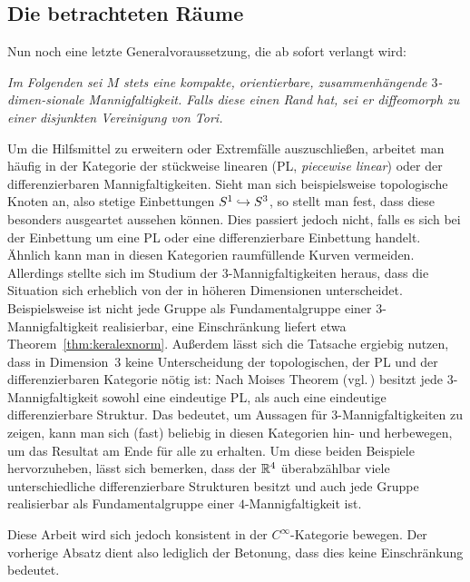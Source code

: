     \subsection{Die betrachteten Räume}
    	Nun noch eine letzte Generalvoraussetzung, die ab sofort verlangt wird:

       \emph{Im Folgenden sei $M$ stets eine kompakte, orientierbare, zusammenhängende $3$-dimen-sionale Mannigfaltigkeit. Falls diese einen Rand hat, sei er diffeomorph zu einer disjunkten Vereinigung von Tori.}

        Um die Hilfsmittel zu erweitern oder Extremfälle auszuschließen, arbeitet man häufig in der Kategorie der stückweise linearen (PL, \textit{piecewise linear}) oder der differenzierbaren Mannigfaltigkeiten. Sieht man sich beispielsweise topologische Knoten an, also stetige Einbettungen $S^1 \hookrightarrow S^3$, so stellt man fest, dass diese besonders ausgeartet aussehen können. Dies passiert jedoch nicht, falls es sich bei der Einbettung um eine PL oder eine differenzierbare Einbettung handelt. Ähnlich kann man in diesen Kategorien raumfüllende Kurven vermeiden. Allerdings stellte sich im Studium der $3$-Mannigfaltigkeiten heraus, dass die Situation sich erheblich von der in höheren Dimensionen unterscheidet. Beispielsweise ist nicht jede Gruppe als Fundamentalgruppe einer $3$-Mannigfaltigkeit realisierbar, eine Einschränkung liefert etwa Theorem~\ref{thm:keralexnorm}. Außerdem lässt sich die Tatsache ergiebig nutzen, dass in Dimension~$3$ keine Unterscheidung der topologischen, der PL und der differenzierbaren Kategorie nötig ist: Nach Moises Theorem (vgl.\,\cite{Moise.1952}) besitzt jede $3$-Mannigfaltigkeit sowohl eine eindeutige PL, als auch eine eindeutige differenzierbare Struktur. Das bedeutet, um Aussagen für $3$-Mannigfaltigkeiten zu zeigen, kann man sich (fast) beliebig in diesen Kategorien hin- und herbewegen, um das Resultat am Ende für alle zu erhalten. Um diese beiden Beispiele hervorzuheben, lässt sich bemerken, dass der $\mathbb{R}^4$ überabzählbar viele unterschiedliche differenzierbare Strukturen besitzt und auch jede Gruppe realisierbar als Fundamentalgruppe einer $4$-Mannigfaltigkeit ist.

        Diese Arbeit wird sich jedoch konsistent in der $C^\infty$-Kategorie bewegen. Der vorherige Absatz dient also lediglich der Betonung, dass dies keine Einschränkung bedeutet. 
